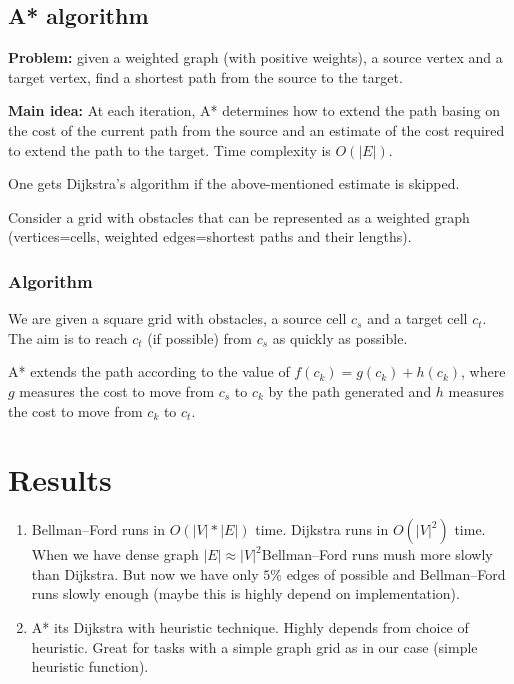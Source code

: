 \documentclass[a4paper,article,14pt]{extarticle}
\begin{document}
	\subsection{A* algorithm}
	\textbf{Problem:} given a weighted graph (with positive weights), a source vertex and a target vertex, find a shortest path from the source to the target.
	
	\textbf{Main idea:} At each iteration, A* determines how to extend the path basing on the cost of the current path from the source and an estimate of the cost required to extend the path to the target. Time complexity is $O(|E|)$.
	
	One gets Dijkstra’s algorithm if the above-mentioned estimate is skipped.
	
	Consider a grid with obstacles that can be represented as a weighted graph (vertices=cells, weighted edges=shortest paths and their lengths).
	
	\subsubsection{Algorithm}
	We are given a square grid with obstacles, a source cell $c_s$ and a target cell $c_t$. The aim is to reach $c_t$ (if possible) from $c_s$ as quickly as possible. 
	
	A* extends the path according to the value of $f(c_k) = g(c_k) + h(c_k)$, where $g$ measures the cost to move from $c_s$ to $c_k$ by the path generated and $h$ measures the cost to move from $c_k$ to $c_t$.
	
	
	
	\section{Results}
	
	\begin{enumerate}[label=\Roman*]
		\item Bellman–Ford runs in $O(|V|*|E|)$ time. Dijkstra runs in $O(|V|^2)$ time. When we have dense graph $|E| \approx |V|^2$Bellman–Ford runs mush more slowly than Dijkstra. But now we have only $5\%$ edges of possible and Bellman–Ford runs slowly enough (maybe this is highly depend on implementation).
		\item A* its Dijkstra with heuristic technique. Highly depends from choice of heuristic. Great for tasks with a simple graph grid as in our case (simple heuristic function).
	\end{enumerate}
\end{document}
